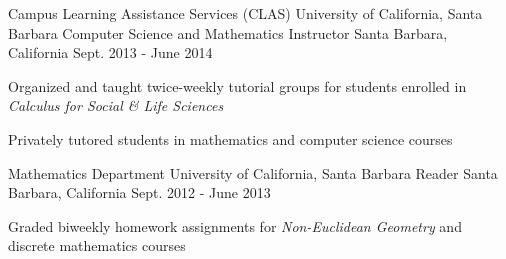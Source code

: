 \begin{cventries}
  \cventry
{Campus Learning Assistance Services (CLAS) \newline University of California, Santa Barbara}
    {Computer Science and Mathematics Instructor}
    {Santa Barbara, California}
    {Sept. 2013 - June 2014}
    {
      \begin{cvitems}
	\item {Organized and taught twice-weekly tutorial groups for students enrolled in \emph{Calculus for Social \& Life Sciences}}
        \item {Privately tutored students in mathematics and computer science courses}
      \end{cvitems}
    }

  \cventry
{Mathematics Department \newline University of California, Santa Barbara}
    {Reader}
    {Santa Barbara, California}
    {Sept. 2012 - June 2013}
    {
      \begin{cvitems}
	\item {Graded biweekly homework assignments for \emph{Non-Euclidean Geometry} and discrete mathematics courses}
      \end{cvitems}
    }



  \end{cventries}

